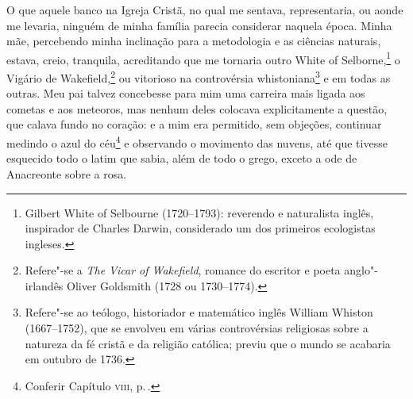O que aquele banco na Igreja Cristã, no qual me sentava, representaria,
ou aonde me levaria, ninguém de minha família parecia considerar naquela
época. Minha mãe, percebendo minha inclinação para a metodologia e as
ciências naturais, estava, creio, tranquila, acreditando que me tornaria
outro White of Selborne,\footnote{Gilbert White of Selbourne (1720--1793):
  reverendo e naturalista inglês, inspirador de Charles Darwin,
  considerado um dos primeiros ecologistas ingleses.} o
Vigário de Wakefield,\footnote{Refere"-se a \textit{The Vicar of Wakefield},
  romance do escritor e poeta anglo"-irlandês Oliver Goldsmith (1728 ou
  1730--1774).} ou vitorioso na controvérsia
whistoniana\footnote{Refere"-se ao teólogo, historiador e matemático
  inglês William Whiston (1667--1752), que se envolveu em várias
  controvérsias religiosas sobre a natureza da fé cristã e da religião
  católica; previu que o mundo se acabaria em outubro de 1736.} e em todas as outras. Meu pai talvez concebesse para mim uma
carreira mais ligada aos cometas e aos meteoros, mas nenhum deles
colocava explicitamente a questão, que calava fundo no coração: e a mim
era permitido, sem objeções, continuar medindo o azul do céu\footnote{Conferir
  Capítulo \textsc{viii}, p.\,\pageref{176}.} e observando o movimento das
nuvens, até que tivesse esquecido todo o latim que sabia, além de todo o
grego, exceto a ode de Anacreonte sobre a rosa.


